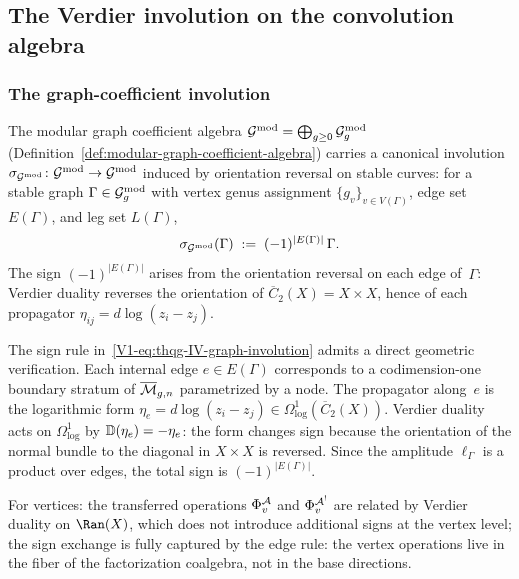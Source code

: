 %
%

\subsection{The Verdier involution on the convolution algebra}

\subsubsection{The graph-coefficient involution}

\begin{definition}
The modular graph coefficient algebra
$\mathcal{G}^{\mathrm{mod}} = \bigoplus_{g \geq 0} \mathcal{G}^{\mathrm{mod}}_g$
(Definition~\ref{def:modular-graph-coefficient-algebra})
carries a canonical involution
$\sigma_{\mathcal{G}^{\mathrm{mod}}}\colon \mathcal{G}^{\mathrm{mod}} \to \mathcal{G}^{\mathrm{mod}}$
induced by orientation reversal on stable curves:
for a stable graph $\Gamma \in \mathcal{G}^{\mathrm{mod}}_g$ with vertex genus assignment
$\{g_v\}_{v \in V(\Gamma)}$, edge set $E(\Gamma)$, and leg set
$L(\Gamma)$,
\begin{equation}%
\sigma_{\Gmod}(\Gamma)
\;:=\;
(-1)^{|E(\Gamma)|}\,\Gamma.
\end{equation}
The sign $(-1)^{|E(\Gamma)|}$ arises from the orientation reversal on
each edge of~$\Gamma$: Verdier duality reverses the orientation of
$\overline{C}_2(X) = X \times X$, hence of each propagator
$\eta_{ij} = d\log(z_i - z_j)$.
\end{definition}

\begin{remark}
The sign rule in~\eqref{V1-eq:thqg-IV-graph-involution} admits a direct
geometric verification. Each internal edge $e \in E(\Gamma)$
corresponds to a codimension-one boundary stratum of $\overline{\mathcal{M}}_{g,n}$
parametrized by a node. The propagator along~$e$ is the logarithmic
form $\eta_e = d\log(z_i - z_j) \in \Omega^1_{\log}(\overline{C}_2(X))$.
Verdier duality acts on $\Omega^1_{\log}$ by
$\mathbb{D}(\eta_e) = -\eta_e$: the form changes sign because the orientation
of the normal bundle to the diagonal in $X \times X$ is reversed.
Since the amplitude $\ell_\Gamma$ is a product over edges, the total
sign is $(-1)^{|E(\Gamma)|}$.

For vertices: the transferred operations $\Phi_v^{\mathcal{A}}$ and $\Phi_v^{\mathcal{A}^!}$
are related by Verdier duality on $\Ran(X)$, which does not introduce
additional signs at the vertex level; the sign exchange is fully
captured by the edge rule: the vertex operations live in
the fiber of the factorization coalgebra, not in the base directions.
\end{remark}

